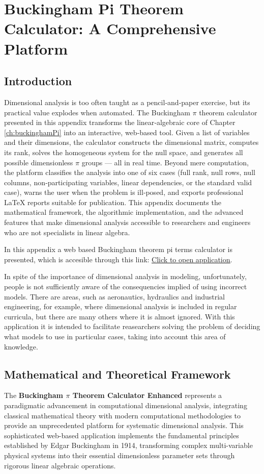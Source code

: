 \startcontents[chapter]
\chapter{Buckingham Pi Theorem Calculator: A Comprehensive Platform}\label{Calculator}
\minitocboxed

\section*{Introduction}
Dimensional analysis is too often taught as a pencil‑and‑paper exercise, but its practical value explodes when automated. The Buckingham $\pi$ theorem calculator presented in this appendix transforms the linear‑algebraic core of Chapter \ref{ch:buckinghamPi} into an interactive, web‑based tool. Given a list of variables and their dimensions, the calculator constructs the dimensional matrix, computes its rank, solves the homogeneous system for the null space, and generates all possible dimensionless $\pi$ groups — all in real time. Beyond mere computation, the platform classifies the analysis into one of six cases (full rank, null rows, null columns, non‑participating variables, linear dependencies, or the standard valid case), warns the user when the problem is ill‑posed, and exports professional LaTeX reports suitable for publication. This appendix documents the mathematical framework, the algorithmic implementation, and the advanced features that make dimensional analysis accessible to researchers and engineers who are not specialists in linear algebra.

In this appendix a web based Buckingham theorem pi terms calculator is presented, which is accesible through this link: \href{http://enriquecastilloron.github.io/PRUEBA/ObtainPiTerms_Flexible_LinearBUENO9a.html}{\underline{Click to open application}}.

In spite of the importance of dimensional analysis in modeling, unfortunately, people is not sufficiently aware of the consequencies implied of using incorrect models. There are areas, such as aeronautics, hydraulics and industrial engineering, for example, where dimensional analysis is included in regular curricula, but there are many others where it is almost ignored. With this application it is intended to facilitate reasearchers solving the problem of deciding what models to use in particular cases, taking into account this area of knowledge.

\section{Mathematical and Theoretical Framework}
The \textbf{Buckingham $\pi$ Theorem Calculator Enhanced} represents a paradigmatic advancement in computational dimensional analysis, integrating classical mathematical theory with modern computational methodologies to provide an unprecedented platform for systematic dimensional analysis. This sophisticated web-based application implements the fundamental principles established by Edgar Buckingham in 1914, transforming complex multi-variable physical systems into their essential dimensionless parameter sets through rigorous linear algebraic operations.


